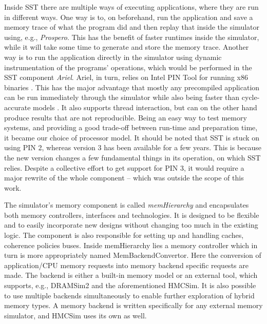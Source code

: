 Inside SST there are multiple ways of executing applications, where they are run in different ways. One way is to, on beforehand, run the application and save a memory trace of what the program did and then replay that inside the simulator using, e.g., \emph{Prospero}. This has the benefit of faster runtimes inside the simulator, while it will take some time to generate and store the memory trace. Another way is to run the application directly in the simulator using dynamic instrumentation of the programs' operations, which would be performed in the SST component \emph{Ariel}. Ariel, in turn, relies on Intel PIN Tool for running x86 binaries \cite{Luk:2005:PBC:1065010.1065034}. This has the major advantage that mostly any precompiled application can be run immediately through the simulator while also being faster than cycle-accurate models \cite{hammond2018structural}. It also supports thread interaction, but can on the other hand produce results that are not reproducible. Being an easy way to test memory systems, and providing a good trade-off between run-time and preparation time, it became our choice of processor model. It should be noted that SST is stuck on using PIN 2, whereas version 3 has been available for a few years. This is because the new version changes a few fundamental things in its operation, on which SST relies. Despite a collective effort to get support for PIN 3, it would require a major rewrite of the whole component -- which was outside the scope of this work.
\bigskip

The simulator's memory component is called \emph{memHierarchy} and encapsulates both memory controllers, interfaces and technologies. It is designed to be flexible and to easily incorporate new designs without changing too much in the existing logic. The component is also responsible for setting up and handling caches, coherence policies buses. Inside memHierarchy lies a memory controller which in turn is more appropriately named MemBackendConvertor. Here the conversion of application/CPU memory requests into memory backend specific requests are made. The backend is either a built-in memory model or an external tool, which supports, e.g., DRAMSim2 and the aforementioned HMCSim. It is also possible to use multiple backends simultaneously to enable further exploration of hybrid memory types. A memory backend is written specifically for any external memory simulator, and HMCSim uses its own as well.
\bigskip


